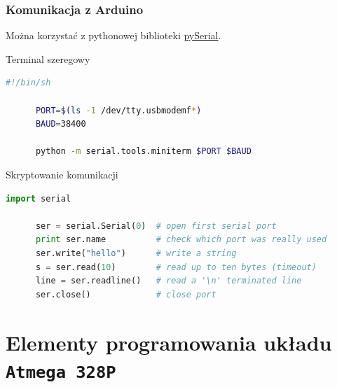 \documentclass[8pt]{beamer}
\begin{document}
\begin{frame}[fragile]
  \frametitle{Komunikacja z Arduino}

  Można korzystać z pythonowej biblioteki \href{http://pyserial.sourceforge.net/}{pySerial}.

  \begin{exampleblock}{Terminal szeregowy}
    \begin{lstlisting}[language=sh,gobble=5]
      #!/bin/sh

      PORT=$(ls -1 /dev/tty.usbmodemf*)
      BAUD=38400

      python -m serial.tools.miniterm $PORT $BAUD
    \end{lstlisting}
  \end{exampleblock}

  \begin{exampleblock}{Skryptowanie komunikacji}
    \begin{lstlisting}[language=python,gobble=5]
      import serial

      ser = serial.Serial(0)  # open first serial port
      print ser.name          # check which port was really used
      ser.write("hello")      # write a string
      s = ser.read(10)        # read up to ten bytes (timeout)
      line = ser.readline()   # read a '\n' terminated line
      ser.close()             # close port
    \end{lstlisting}
  \end{exampleblock}
\end{frame}

\section*{Elementy programowania układu \texttt{Atmega 328P}}
\end{document}
